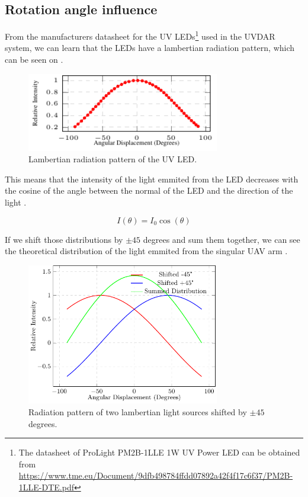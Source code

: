 \newpage

\subsection{Rotation angle influence}

From the manufacturers datasheet for the UV LEDs\footnote{The datasheet of ProLight PM2B-1LLE 1W UV Power LED can be obtained from \url{https://www.tme.eu/Document/9dfb498784ffdd07892a42f4f17c6f37/PM2B-1LLE-DTE.pdf}}
used in the UVDAR system, we can learn that the LEDs have a lambertian radiation pattern,
which can be seen on .

\begin {figure}[htbp]
	\centering
	\includegraphics[width=0.75\textwidth]{./fig/plots/lambertian/lambertian.pdf}
	\caption{Lambertian radiation pattern of the UV LED.}
	\label{fig:lambertian}
\end{figure}

This means that the intensity of the light emmited from the LED decreases with the cosine
of the angle between the normal of the LED and the direction of the light .

\begin{equation}
	I(\theta) = I_0\cos(\theta)
	\label{eq:lambertian}
\end{equation}

If we shift those distributions by $\pm 45$ degrees and sum them together, we can see the
theoretical distribution of the light emmited from the singular UAV arm .

\begin {figure}[htbp]
	\centering
	\includegraphics[width=0.75\textwidth]{./fig/plots/lambertian/3lambertian.pdf}
	\caption{Radiation pattern of two lambertian light sources shifted by $\pm 45$ degrees.}
	\label{fig:lambert_combined}
\end{figure}